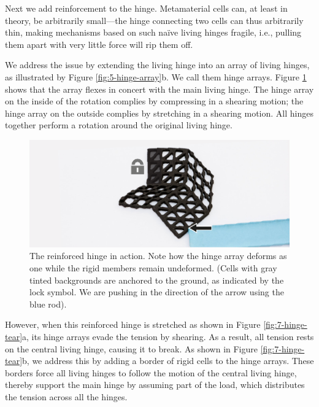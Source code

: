 Next we add reinforcement to the hinge. Metamaterial cells can, at least in theory, be arbitrarily small—the hinge connecting two cells can thus arbitrarily thin, making mechanisms based on such naïve living hinges fragile, i.e., pulling them apart with very little force will rip them off.

We address the issue by extending the living hinge into an array of living hinges, as illustrated by Figure \ref{fig:5-hinge-array}b. We call them hinge arrays. Figure \ref{fig:6-simple-hinge-rotation} shows that the array flexes in concert with the main living hinge. The hinge array on the inside of the rotation complies by compressing in a shearing motion; the hinge array on the outside complies by stretching in a shearing motion. All hinges together perform a rotation around the original living hinge.

\begin{figure} [h]
    \includegraphics[width=\textwidth]{chapters/metamaterial-mechanisms-FIG/6-simple-hinge-rotation.pdf}
    \caption[Short figure name.]{The reinforced hinge in action. Note how the hinge array deforms as one while the rigid members remain undeformed. (Cells with gray tinted backgrounds are anchored to the ground, as indicated by the lock symbol. We are pushing in the direction of the arrow using the blue rod).
    \label{fig:6-simple-hinge-rotation}}
\end{figure}

However, when this reinforced hinge is stretched as shown in Figure \ref{fig:7-hinge-tear}a, its hinge arrays evade the tension by shearing. As a result, all tension rests on the central living hinge, causing it to break. As shown in Figure \ref{fig:7-hinge-tear}b, we address this by adding a border of rigid cells to the hinge arrays. These borders force all living hinges to follow the motion of the central living hinge, thereby support the main hinge by assuming part of the load, which distributes the tension across all the hinges.

